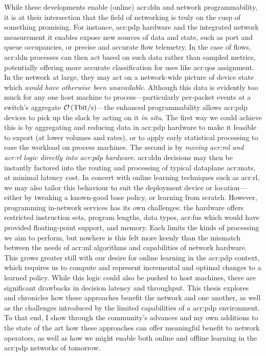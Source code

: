 While these developments enable (online) \gls{acr:ddn} and network programmability, it is at their intersection that the field of networking is truly on the cusp of something promising.
For instance, \gls{acr:pdp} hardware and the integrated network measurement it enables expose new sources of data and state, such as port and queue occupancies, or precise and accurate flow telemetry.
In the case of flows, \gls{acr:ddn} processes can then act based on such data rather than sampled metrics, potentially offering more accurate classification for uses like \gls{acr:qos} assignment.
In the network at large, they may act on a network-wide picture of device state which \emph{would have otherwise been unavailable}.
Although this data is evidently too much for any one host machine to process---particularly per-packet events at a switch's aggregate $\mathcal{O}\left(\unit{\tera\bit\per\second}\right)$---the enhanced programmability allows \gls{acr:pdp} devices to pick up the slack by acting on it \emph{in situ}.
The first way we could achieve this is by aggregating and reducing data in \gls{acr:pdp} hardware to make it feasible to export (at lower volumes and rates), or to apply early statistical processing to ease the workload on process machines.
The second is by \emph{moving \gls{acr:ml} and \gls{acr:rl} logic directly into \gls{acr:pdp} hardware}.
\gls{acr:ddn} decisions may then be instantly factored into the routing and processing of typical dataplane \glspl{acr:mat}, at minimal latency cost.
In concert with online learning techniques such as \gls{acr:rl}, we may also tailor this behaviour to suit the deployment device or location---either by tweaking a known-good base policy, or learning from scratch.
However, programming in-network services has its own challenges: the hardware offers restricted instruction sets, program lengths, data types, \glspl{acr:fu} which would have provided floating-point support, and memory.
Each limits the kinds of processing we aim to perform, but nowhere is this felt more keenly than the mismatch between the needs of \gls{acr:ml} algorithms and capabilities of network hardware.
This grows greater still with our desire for online learning in the \gls{acr:pdp} context, which requires us to compute and represent incremental and optimal changes to a learned policy.
While this logic could also be pushed to host machines, there are significant drawbacks in decision latency and throughput.
This thesis explores and chronicles how these approaches benefit the network and one another, as well as the challenges introduced by the limited capabilities of a \gls{acr:pdp} environment.
To that end, I show through the community's advances and my own additions to the state of the art how these approaches can offer meaningful benefit to network operators, as well as how we might enable both online and offline learning in the \gls{acr:pdp} networks of tomorrow.

